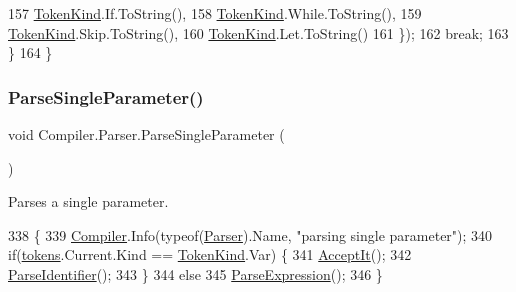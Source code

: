\begin{DoxyCode}
157                                     \mbox{\hyperlink{namespace_compiler_a57929962f25004759596fc3f13cf563c}{TokenKind}}.If.ToString(),
158                                     \mbox{\hyperlink{namespace_compiler_a57929962f25004759596fc3f13cf563c}{TokenKind}}.While.ToString(),
159                                     \mbox{\hyperlink{namespace_compiler_a57929962f25004759596fc3f13cf563c}{TokenKind}}.Skip.ToString(),
160                                     \mbox{\hyperlink{namespace_compiler_a57929962f25004759596fc3f13cf563c}{TokenKind}}.Let.ToString()
161                                 \});
162                                 \textcolor{keywordflow}{break};
163                         \}
164                     \}
\end{DoxyCode}
\mbox{\label{class_compiler_1_1_parser_a8d8a8adab2a324a07947c147df0d250f}} 
\subsubsection{\texorpdfstring{Parse\+Single\+Parameter()}{ParseSingleParameter()}}
{\footnotesize\ttfamily void Compiler.\+Parser.\+Parse\+Single\+Parameter (\begin{DoxyParamCaption}{ }\end{DoxyParamCaption})\hspace{0.3cm}{\ttfamily [protected]}}

Parses a single parameter. 
\begin{DoxyCode}
338                                                           \{
339                         \mbox{\hyperlink{namespace_compiler}{Compiler}}.Info(typeof(\mbox{\hyperlink{class_compiler_1_1_parser_a450e11452db3f91ff866fc1e36ebc79d}{Parser}}).Name, \textcolor{stringliteral}{"parsing single parameter"});
340                         \textcolor{keywordflow}{if}(\mbox{\hyperlink{class_compiler_1_1_parser_a4db075175c853a197c7b8db7d787a0a5}{tokens}}.Current.Kind == \mbox{\hyperlink{namespace_compiler_a57929962f25004759596fc3f13cf563c}{TokenKind}}.Var) \{
341                             \mbox{\hyperlink{class_compiler_1_1_parser_ae19e507e1e2460cbad35b03d24402b4f}{AcceptIt}}();
342                             \mbox{\hyperlink{class_compiler_1_1_parser_af099ac84308e83bf30b3dfd6dc51bd32}{ParseIdentifier}}();
343                         \}
344                         \textcolor{keywordflow}{else}
345                             \mbox{\hyperlink{class_compiler_1_1_parser_a8c6c2073d17ac572fb9117892cbf5aa1}{ParseExpression}}();
346                     \}
\end{DoxyCode}
\mbox{\label{class_compiler_1_1_parser_ad0b467a2202c311d465a11165f602216}} 
